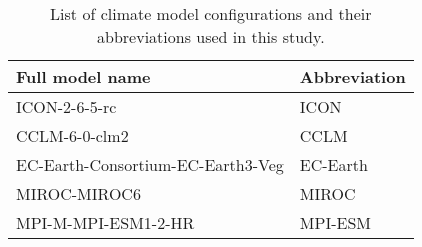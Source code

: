 \begin{table}[htbp]
  \centering
  \caption{List of climate model configurations and their abbreviations used in this study.}
  \label{Table:model_abbrevs}
  \begin{tabular}{p{8cm}l}
    \toprule
    Full model name & Abbreviation \\
    \midrule
    ICON-2-6-5-rc & ICON \\
    CCLM-6-0-clm2 & CCLM \\
    EC-Earth-Consortium-EC-Earth3-Veg & EC-Earth \\
    MIROC-MIROC6 & MIROC \\
    MPI-M-MPI-ESM1-2-HR & MPI-ESM \\
    \bottomrule
  \end{tabular}
\end{table}
